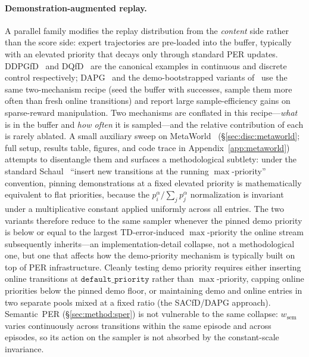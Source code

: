 \documentclass{article}
\begin{document}
\paragraph{Demonstration-augmented replay.}
A parallel family modifies the replay distribution from the
\emph{content} side rather than the score side: expert trajectories are
pre-loaded into the buffer, typically with an elevated priority that
decays only through standard PER updates. DDPGfD~\citep{vecerik2017ddpgfd}
and DQfD~\citep{hester2018dqfd} are the canonical examples in
continuous and discrete control respectively; DAPG~\citep{rajeswaran2017dapg}
and the demo-bootstrapped variants
of~\citet{nair2018overcomingexploration} use the same two-mechanism
recipe (seed the buffer with successes, sample them more often than
fresh online transitions) and report large sample-efficiency gains on
sparse-reward manipulation. Two mechanisms are conflated in this
recipe---\emph{what} is in the buffer and \emph{how often} it is
sampled---and the relative contribution of each is rarely ablated.
A small auxiliary sweep on MetaWorld~\citep{yu2019metaworld}
(\S\ref{sec:disc:metaworld}; full setup, results table, figures, and
code trace in Appendix~\ref{app:metaworld}) attempts to disentangle
them and surfaces a methodological subtlety: under the standard
Schaul~\citep{schaul2016per} ``insert new transitions at the running
$\max$-priority'' convention, pinning demonstrations at a fixed
elevated priority is mathematically equivalent to flat priorities,
because the $p_i^\alpha/\sum_j p_j^\alpha$ normalization is invariant
under a multiplicative constant applied uniformly across all entries.
The two variants therefore reduce to the same sampler whenever the
pinned demo priority is below or equal to the largest TD-error-induced
$\max$-priority the online stream subsequently inherits---an
implementation-detail collapse, not a methodological one, but one that
affects how the demo-priority mechanism is typically built on top of
PER infrastructure. Cleanly testing demo priority requires either
inserting online transitions at $\texttt{default\_priority}$ rather
than $\max$-priority, capping online priorities below the pinned demo
floor, or maintaining demo and online entries in two separate pools
mixed at a fixed ratio (the SACfD/DAPG approach). Semantic~PER
(\S\ref{sec:method:sper}) is not vulnerable to the same collapse:
$w_{\text{sem}}$ varies continuously across transitions within the
same episode and across episodes, so its action on the sampler is not
absorbed by the constant-scale invariance.
\end{document}
